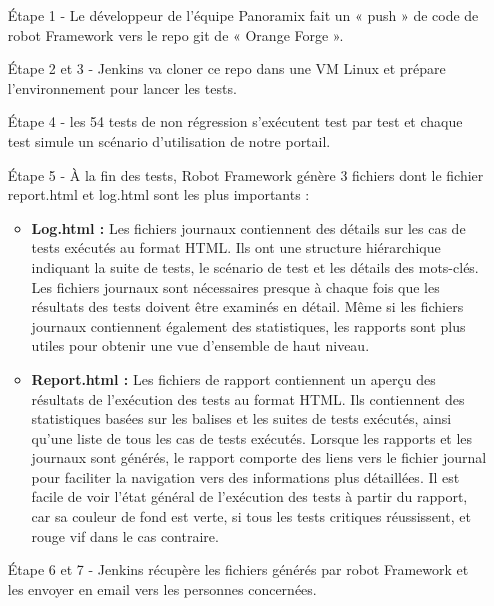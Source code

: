 \begin{enumerate}
	\item[Étape 1 -] Le développeur de l’équipe Panoramix fait un « push » de code de robot Framework vers le repo git de « Orange Forge ».
	\item[Étape 2 et 3 -] Jenkins va cloner ce repo dans une VM Linux et prépare l’environnement pour lancer les tests.
	\item[Étape 4 -] les 54 tests de non régression s’exécutent test par test et chaque test simule un scénario d’utilisation de notre portail.
	\item[Étape 5 -] À la fin des tests, Robot Framework génère 3 fichiers dont le fichier report.html et log.html sont les plus importants :
	\begin{itemize}
		\item\textbf{ Log.html :} Les fichiers journaux contiennent des détails sur les cas de tests exécutés au format HTML. Ils ont une structure hiérarchique indiquant la suite de tests, le scénario de test et les détails des mots-clés. Les fichiers journaux sont nécessaires presque à chaque fois que les résultats des tests doivent être examinés en détail. Même si les fichiers journaux contiennent également des statistiques, les rapports sont plus utiles pour obtenir une vue d'ensemble de haut niveau.
		\item \textbf{Report.html :} Les fichiers de rapport contiennent un aperçu des résultats de l'exécution des tests au format HTML. Ils contiennent des statistiques basées sur les balises et les suites de tests exécutés, ainsi qu'une liste de tous les cas de tests exécutés. Lorsque les rapports et les journaux sont générés, le rapport comporte des liens vers le fichier journal pour faciliter la navigation vers des informations plus détaillées. Il est facile de voir l'état général de l'exécution des tests à partir du rapport, car sa couleur de fond est verte, si tous les tests critiques réussissent, et rouge vif dans le cas contraire.
	\end{itemize}
	\item[Étape 6 et 7 -]  Jenkins récupère les fichiers générés par robot Framework et les envoyer en email vers les personnes concernées.
\end{enumerate}
\newpage
